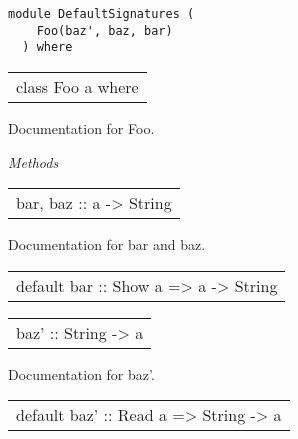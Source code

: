 \label{module:DefaultSignatures}
\haddockbeginheader
{\haddockverb\begin{verbatim}
module DefaultSignatures (
    Foo(baz', baz, bar)
  ) where\end{verbatim}}
\haddockendheader

\begin{haddockdesc}
\item[\begin{tabular}{@{}l}
class Foo a where
\end{tabular}]
{\haddockbegindoc
Documentation for Foo.\par
\haddockpremethods{}\emph{Methods}
\begin{haddockdesc}
\item[\begin{tabular}{@{}l}
bar, baz :: a -> String
\end{tabular}]
{\haddockbegindoc
Documentation for bar and baz.\par}
\end{haddockdesc}
\begin{haddockdesc}
\item[\begin{tabular}{@{}l}
default bar :: Show a => a -> String
\end{tabular}]
\end{haddockdesc}
\begin{haddockdesc}
\item[\begin{tabular}{@{}l}
baz' :: String -> a
\end{tabular}]
{\haddockbegindoc
Documentation for baz'.\par}
\end{haddockdesc}
\begin{haddockdesc}
\item[\begin{tabular}{@{}l}
default baz' :: Read a => String -> a
\end{tabular}]
\end{haddockdesc}}
\end{haddockdesc}